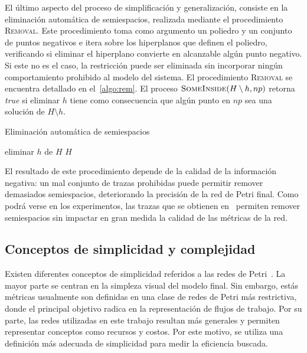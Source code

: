 El último aspecto del proceso de simplificación y generalización,
consiste en la eliminación automática  de semiespacios,
realizada mediante el procedimiento \textsc{Removal}.
Este procedimiento toma como argumento un poliedro y un conjunto de puntos
negativos e itera sobre los hiperplanos que definen el poliedro,
verificando si eliminar el hiperplano convierte en alcanzable algún punto negativo.
Si este no es el caso, la restricción puede ser eliminada sin incorporar
ningún comportamiento prohibido al modelo del sistema. El procedimiento \textsc{Removal}
se encuentra detallado en el~\autoref{algo:rem}. El proceso $\textsc{SomeInside}(H \setminus h, np)$
retorna \textit{true} si eliminar $h$ tiene como consecuencia que algún punto en $np$
sea una solución de $H \setminus {h}$.

\begin{algorithm}[h]
\caption{Eliminación automática de semiespacios}
    \begin{algorithmic}[1]
                    \State eliminar $h$ de $H$
                \EndIf
            \EndFor
            \State \Return $H$
        \EndProcedure
    \end{algorithmic}
    \label{algo:rem}
\end{algorithm}

El resultado de este procedimiento depende de la calidad de la información negativa:
un mal conjunto de trazas prohibidas puede permitir remover demasiados semiespacios,
deteriorando la precisión de la red de Petri final. Como podrá verse en los experimentos,
las trazas que se obtienen en~\cite{BrouckeWVB14} permiten remover semiespacios sin 
impactar en gran medida la calidad de las métricas de la red.

\subsection{Conceptos de simplicidad y complejidad}
\label{sec:3.complexity}

Existen diferentes conceptos de simplicidad referidos a las redes de Petri~\cite{Lassen08,Mendling2007}. 
La mayor parte se centran en la simpleza visual del modelo final. Sin embargo, estás métricas usualmente 
son definidas en una clase de redes de Petri más restrictiva, donde el principal objetivo radica en la 
representación de flujos de trabajo. Por su parte, las redes utilizadas en este trabajo resultan más generales
y permiten representar conceptos como recursos y costos. Por este motivo, se utiliza una definición más adecuada
de simplicidad para medir la eficiencia buscada.

